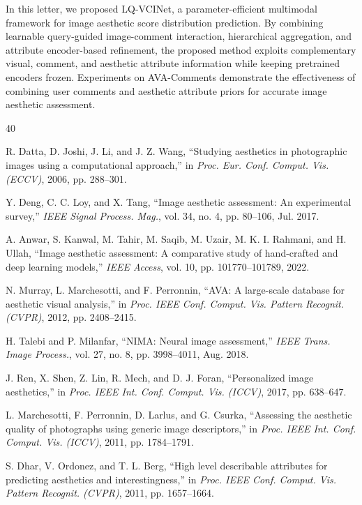 \documentclass[journal]{IEEEtran}
\begin{document}
In this letter, we proposed LQ-VCINet, a parameter-efficient multimodal framework for image aesthetic score distribution prediction. By combining learnable query-guided image-comment interaction, hierarchical aggregation, and attribute encoder-based refinement, the proposed method exploits complementary visual, comment, and aesthetic attribute information while keeping pretrained encoders frozen. Experiments on AVA-Comments demonstrate the effectiveness of combining user comments and aesthetic attribute priors for accurate image aesthetic assessment.

\newpage

\begin{thebibliography}{40}

R. Datta, D. Joshi, J. Li, and J. Z. Wang, ``Studying aesthetics in photographic images using a computational approach,'' in \emph{Proc. Eur. Conf. Comput. Vis. (ECCV)}, 2006, pp. 288--301.

Y. Deng, C. C. Loy, and X. Tang, ``Image aesthetic assessment: An experimental survey,'' \emph{IEEE Signal Process. Mag.}, vol. 34, no. 4, pp. 80--106, Jul. 2017.

A. Anwar, S. Kanwal, M. Tahir, M. Saqib, M. Uzair, M. K. I. Rahmani, and H. Ullah, ``Image aesthetic assessment: A comparative study of hand-crafted and deep learning models,'' \emph{IEEE Access}, vol. 10, pp. 101770--101789, 2022.

N. Murray, L. Marchesotti, and F. Perronnin, ``AVA: A large-scale database for aesthetic visual analysis,'' in \emph{Proc. IEEE Conf. Comput. Vis. Pattern Recognit. (CVPR)}, 2012, pp. 2408--2415.

H. Talebi and P. Milanfar, ``NIMA: Neural image assessment,'' \emph{IEEE Trans. Image Process.}, vol. 27, no. 8, pp. 3998--4011, Aug. 2018.

J. Ren, X. Shen, Z. Lin, R. Mech, and D. J. Foran, ``Personalized image aesthetics,'' in \emph{Proc. IEEE Int. Conf. Comput. Vis. (ICCV)}, 2017, pp. 638--647.

L. Marchesotti, F. Perronnin, D. Larlus, and G. Csurka, ``Assessing the aesthetic quality of photographs using generic image descriptors,'' in \emph{Proc. IEEE Int. Conf. Comput. Vis. (ICCV)}, 2011, pp. 1784--1791.

S. Dhar, V. Ordonez, and T. L. Berg, ``High level describable attributes for predicting aesthetics and interestingness,'' in \emph{Proc. IEEE Conf. Comput. Vis. Pattern Recognit. (CVPR)}, 2011, pp. 1657--1664.


\end{thebibliography}
\end{document}
